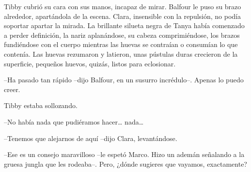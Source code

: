 {Tibby cubrió su cara con sus manos, incapaz de mirar. Balfour le puso su
 brazo alrededor, apartándola de la escena. Clara, insensible con la
 repulsión, no podía soportar apartar la mirada. La brillante silueta
 negra de Tanya había comenzado a perder definición, la nariz
 aplanándose, su cabeza comprimiéndose, los brazos fundiéndose con el
 cuerpo mientras las huevas se contraían o consumían lo que contenía. Las
 huevas rezumaron y latieron, unas pústulas duras crecieron de la
superficie, pequeños huevos, quizás, listos para eclosionar.}

{--Ha pasado tan rápido --dijo Balfour, en un susurro incrédulo--. Apenas
lo puedo creer.}

{Tibby estaba sollozando.}

{--No había nada que pudiéramos hacer\ldots{} nada\ldots{}}

{--Tenemos que alejarnos de aquí --dijo Clara, levantándose.}

{--Ese es un consejo maravilloso --le espetó Marco. Hizo un ademán
 señalando a la gruesa jungla que les rodeaba--. Pero, ¿dónde sugieres
que vayamos, exactamente?}
